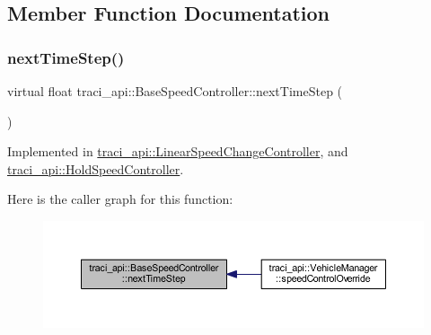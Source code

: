\subsection{Member Function Documentation}
\mbox{\label{classtraci__api_1_1_base_speed_controller_ab9658ce36f91de8a34bb710b3241c210}} 
\subsubsection{\texorpdfstring{next\+Time\+Step()}{nextTimeStep()}}
{\footnotesize\ttfamily virtual float traci\+\_\+api\+::\+Base\+Speed\+Controller\+::next\+Time\+Step (\begin{DoxyParamCaption}{ }\end{DoxyParamCaption})\hspace{0.3cm}{\ttfamily [pure virtual]}}



Implemented in \hyperlink{classtraci__api_1_1_linear_speed_change_controller_a31e52d6f77c96a88dda160226335bacd}{traci\+\_\+api\+::\+Linear\+Speed\+Change\+Controller}, and \hyperlink{classtraci__api_1_1_hold_speed_controller_a61476bf22b8252d2a0badd2214b7357a}{traci\+\_\+api\+::\+Hold\+Speed\+Controller}.

Here is the caller graph for this function\+:
\nopagebreak
\begin{figure}[H]
\begin{center}
\leavevmode
\includegraphics[width=350pt]{classtraci__api_1_1_base_speed_controller_ab9658ce36f91de8a34bb710b3241c210_icgraph}
\end{center}
\end{figure}
\mbox{\label{classtraci__api_1_1_base_speed_controller_a2d4b22945d4cb27f5fe24b05700021b6}} 
